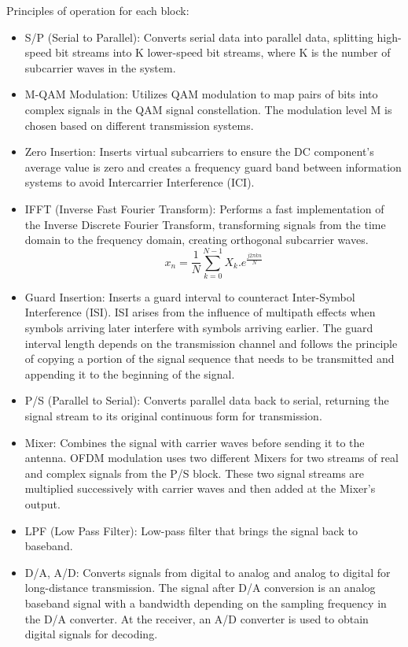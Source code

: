 Principles of operation for each block:
\begin{itemize}
    \item S/P (Serial to Parallel): Converts serial data into parallel data, splitting high-speed bit streams into K lower-speed bit streams, where K is the number of subcarrier waves in the system.
    \item M-QAM Modulation: Utilizes QAM modulation to map pairs of bits into complex signals in the QAM signal constellation. The modulation level M is chosen based on different transmission systems.
    \item Zero Insertion: Inserts virtual subcarriers to ensure the DC component's average value is zero and creates a frequency guard band between information systems to avoid Intercarrier Interference (ICI).
    \item IFFT (Inverse Fast Fourier Transform): Performs a fast implementation of the Inverse Discrete Fourier Transform, transforming signals from the time domain to the frequency domain, creating orthogonal subcarrier waves.
    \begin{equation}
        x_n = \frac{1}{N} \sum_{k=0}^{N-1} X_k . e^\frac{j2\pi kn}{N}
    \end{equation}
    \item Guard Insertion: Inserts a guard interval to counteract Inter-Symbol Interference (ISI). ISI arises from the influence of multipath effects when symbols arriving later interfere with symbols arriving earlier. The guard interval length depends on the transmission channel and follows the principle of copying a portion of the signal sequence that needs to be transmitted and appending it to the beginning of the signal.
    \item P/S (Parallel to Serial): Converts parallel data back to serial, returning the signal stream to its original continuous form for transmission.
    \item Mixer: Combines the signal with carrier waves before sending it to the antenna. OFDM modulation uses two different Mixers for two streams of real and complex signals from the P/S block. These two signal streams are multiplied successively with carrier waves and then added at the Mixer's output.
    \item LPF (Low Pass Filter): Low-pass filter that brings the signal back to baseband.
    \item D/A, A/D: Converts signals from digital to analog and analog to digital for long-distance transmission. The signal after D/A conversion is an analog baseband signal with a bandwidth depending on the sampling frequency in the D/A converter. At the receiver, an A/D converter is used to obtain digital signals for decoding.

\end{itemize}

